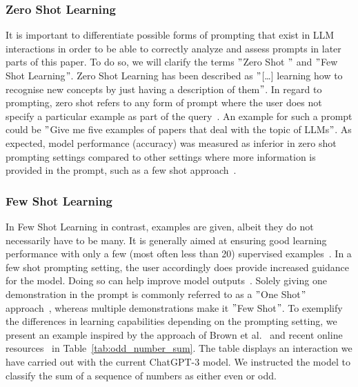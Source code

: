 \subsubsection{Zero Shot Learning} %
It is important to differentiate possible forms of prompting that exist in LLM interactions in order
to be able to correctly analyze and assess prompts in later parts of this paper.
To do so, we will clarify the terms \("\)Zero Shot \("\) and \("\)Few Shot Learning\("\).
Zero Shot Learning has been described as \("\)[\ldots] learning how to recognise
new concepts by just having a description of them\("\)\cite[p. 1]{feris_embarrassingly_2015}.
In regard to prompting, zero shot refers to any form of prompt where the user does not specify
a particular example as part of the query~\cite[p. 1]{dang_how_2022}.
An example for such a prompt could be \("\)Give me five examples of papers that deal with the topic
of LLMs\("\).
As expected, model performance (accuracy) was measured as inferior in zero shot prompting
settings compared
to other settings where more information is provided in the prompt, such as a few shot approach~\cite[p. 5]{brown_language_2020}.


\subsubsection{Few Shot Learning}
In Few Shot Learning in contrast, examples are given, albeit they do not necessarily have to be
many.
It is generally aimed at ensuring good learning performance with only a few (most often less than 20)
supervised examples~\cite[p. 1]{samuel_offline_2022}. %
In a few shot prompting setting, the user accordingly does provide increased guidance for the model.
Doing so can help improve model outputs~\cite[p. 1]{dang_how_2022}.
Solely giving one demonstration in the prompt is commonly referred to as a \("\)One Shot\("\)
approach~\cite[p. 6]{brown_language_2020},
whereas multiple demonstrations make it \("\)Few Shot\("\).
To exemplify the differences in learning capabilities depending on the prompting setting,
we present an example inspired by the approach of Brown et al\(.\)~\cite{brown_language_2020}
and recent online resources~\cite{dairai_few-shot_2023} in Table~\ref{tab:odd_number_sum}.
The table displays an interaction we have carried out with the current ChatGPT-3 model.
We instructed the model to classify the sum of a sequence of numbers as either even or odd.

